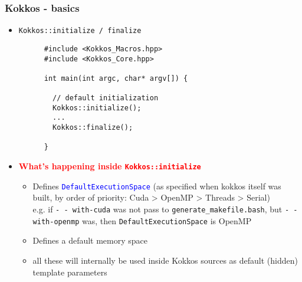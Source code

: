 \begin{frame}[fragile=singleslide]
  \frametitle{Kokkos - basics}

  \begin{itemize}
  \item \texttt{Kokkos::initialize / finalize}
    \begin{verbatim}
      #include <Kokkos_Macros.hpp>
      #include <Kokkos_Core.hpp>
      
      int main(int argc, char* argv[]) {
        
        // default initialization
        Kokkos::initialize();
        ...
        Kokkos::finalize();
        
      }
    \end{verbatim}
  \item \textcolor{red}{\textbf{What's happening inside \texttt{Kokkos::initialize}}}
    \begin{itemize}
    \item Defines \textcolor{blue}{\texttt{DefaultExecutionSpace}} (as specified when kokkos itself was built, by order of priority: Cuda > OpenMP > Threads > Serial)\\
      e.g. if \texttt{\-- \-- with-cuda} was not pass to \texttt{generate\_makefile.bash}, but \texttt{\-- \-- with-openmp} was, then \texttt{DefaultExecutionSpace} is OpenMP
    \item Defines a default memory space
    \item all these will internally be used inside Kokkos sources as default (hidden) template parameters
    \end{itemize}
  \end{itemize}
\end{frame}

